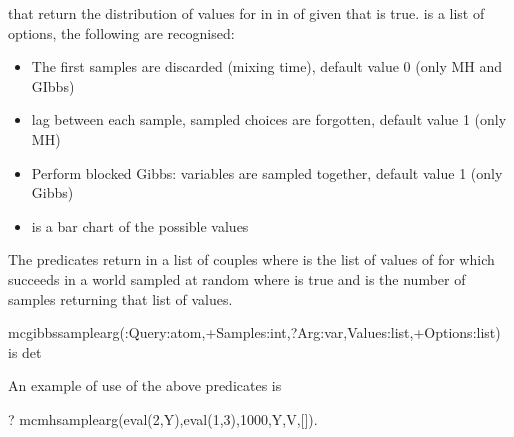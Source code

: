 \documentclass[letterpaper,10pt,english]{sphinxmanual}
\begin{document}
that return the distribution of values for  in  in  of  given that  is true.  is a list of options, the following are recognised:
\begin{itemize}
\item {} 
 The first  samples are discarded (mixing time), default value 0 (only MH and GIbbs)

\item {} 
 lag between each sample,  sampled choices are forgotten, default value 1 (only MH)

\item {} 
 Perform blocked Gibbs:  variables are sampled together, default value 1 (only Gibbs)

\item {} 
  is a bar chart of the possible values

\end{itemize}

The predicates return in  a list of couples  where  is the list of values of  for which  succeeds in a world sampled at random where  is true and  is the number of samples returning that list of values.

\begin{sphinxVerbatim}[commandchars=\\\{\}]
mc\PYGZus{}gibbs\PYGZus{}sample\PYGZus{}arg(:Query:atom,+Samples:int,?Arg:var,\PYGZhy{}Values:list,+Options:list) is det
\end{sphinxVerbatim}

An example of use of the above predicates is

\begin{sphinxVerbatim}[commandchars=\\\{\}]
?\PYGZhy{} mc\PYGZus{}mh\PYGZus{}sample\PYGZus{}arg(eval(2,Y),eval(1,3),1000,Y,V,[]).
\end{sphinxVerbatim}
\end{document}
